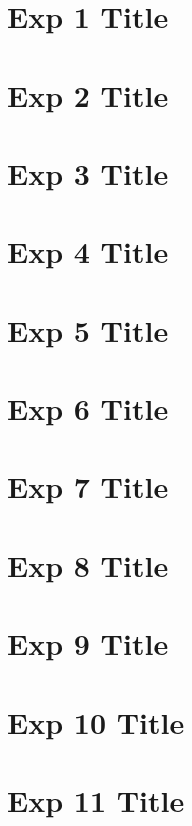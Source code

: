 \documentclass[12pt]{report}
\begin{document}
  \chapter{Exp 1 Title}
  
  
  \chapter{Exp 2 Title}
  
  
  \chapter{Exp 3 Title}
  
    
  \chapter{Exp 4 Title}
  
      
  \chapter{Exp 5 Title}
  
  
  \chapter{Exp 6 Title}
  
  
  \chapter{Exp 7 Title}
  
  
  \chapter{Exp 8 Title}
  
  
  \chapter{Exp 9 Title}
  
  
  \chapter{Exp 10 Title}
  
  
  \chapter{Exp 11 Title}
  
  
\end{document}
